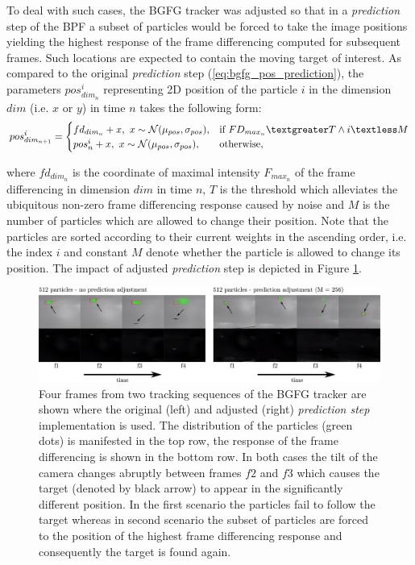 To deal with such cases, the BGFG tracker was adjusted so that in a \textit{prediction} step of the BPF a subset of particles would be forced to take the image positions yielding the highest response of the frame differencing computed for subsequent frames. Such locations are expected to contain the moving target of interest. As compared to the original \textit{prediction} step (\ref{eq:bgfg_pos_prediction}), the parameters $pos_{dim_{n}}^{i}$ representing 2D position of the particle $i$ in the dimension $dim$ (i.e. $x$ or $y$) in time $n$ takes the following form:
\begin{align}
	pos_{dim_{n+1}}^{i} =
	\begin{cases}
		fd_{dim_{n}} + x, ~ x \sim \mathcal{N}(\mu_{pos}, \sigma_{pos}),  & \text{if}\ FD_{max_{n}} \textgreater T \land i \textless M \\
		pos_{n}^{i} + x, ~ x \sim \mathcal{N}(\mu_{pos}, \sigma_{pos}), & \text{otherwise},
	\end{cases}
\end{align}

where $fd_{dim_{n}}$ is the coordinate of maximal intensity $F_{max_{n}}$ of the frame differencing in dimension $dim$ in time $n$, $T$ is the threshold which alleviates the ubiquitous non-zero frame differencing response caused by noise and $M$ is the number of particles which are allowed to change their position. Note that the particles are sorted according to their current weights in the ascending order, i.e. the index $i$ and constant $M$ denote whether the particle is allowed to change its position. The impact of adjusted \textit{prediction} step is depicted in Figure \ref{fig:frame_diff}. 

\begin{figure}[htb]
	\centering
	\includegraphics[width=0.99\linewidth]{fig/frame_diff.pdf}
	\caption{Four frames from two tracking sequences of the BGFG tracker are shown where the original (left) and adjusted (right) \textit{prediction step} implementation is used. The distribution of the particles (green dots) is manifested in the top row, the response of the frame differencing is shown in the bottom row. In both cases the tilt of the camera changes abruptly between frames $f 2$ and $f 3$ which causes the target (denoted by black arrow) to appear in the significantly different position. In the first scenario the particles fail to follow the target whereas in second scenario the subset of particles are forced to the position of the highest frame differencing response and consequently the target is found again.}
	\label{fig:frame_diff}
\end{figure}

